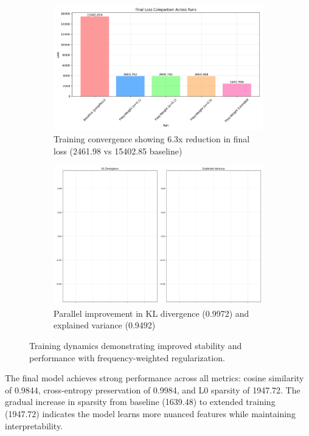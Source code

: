 \documentclass{article} %
\begin{document}
\begin{figure}[h]
    \centering
    \begin{subfigure}{0.49\textwidth}
        \includegraphics[width=\textwidth]{final_loss.png}
        \caption{Training convergence showing 6.3x reduction in final loss (2461.98 vs 15402.85 baseline)}
        \label{fig:loss}
    \end{subfigure}
    \hfill
    \begin{subfigure}{0.49\textwidth}
        \includegraphics[width=\textwidth]{combined_metrics.png}
        \caption{Parallel improvement in KL divergence (0.9972) and explained variance (0.9492)}
        \label{fig:combined}
    \end{subfigure}
    \caption{Training dynamics demonstrating improved stability and performance with frequency-weighted regularization.}
    \label{fig:performance}
\end{figure}

The final model achieves strong performance across all metrics: cosine similarity of 0.9844, cross-entropy preservation of 0.9984, and L0 sparsity of 1947.72. The gradual increase in sparsity from baseline (1639.48) to extended training (1947.72) indicates the model learns more nuanced features while maintaining interpretability.
\end{document}
